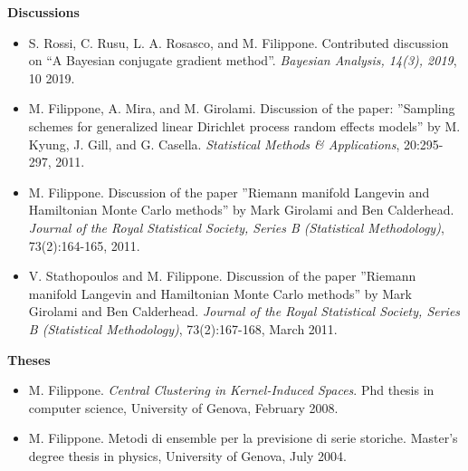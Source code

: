 \begin{itemize}
\end{itemize}\textbf{Discussions}\begin{itemize}\item  S. Rossi, C. Rusu, L. A. Rosasco, and M. Filippone. Contributed discussion on ``A Bayesian conjugate gradient method''. \emph{Bayesian Analysis, 14(3), 2019}, 10 2019.  
\item  M. Filippone, A. Mira, and M. Girolami. Discussion of the paper: ”Sampling schemes for generalized linear Dirichlet process random effects models” by M. Kyung, J. Gill, and G. Casella. \emph{Statistical Methods \& Applications}, 20:295-297, 2011.  
\item  M. Filippone. Discussion of the paper ”Riemann manifold Langevin and Hamiltonian Monte Carlo methods” by Mark Girolami and Ben Calderhead. \emph{Journal of the Royal Statistical Society, Series B (Statistical Methodology)}, 73(2):164-165, 2011.  
\item  V. Stathopoulos and M. Filippone. Discussion of the paper ”Riemann manifold Langevin and Hamiltonian Monte Carlo methods” by Mark Girolami and Ben Calderhead. \emph{Journal of the Royal Statistical Society, Series B (Statistical Methodology)}, 73(2):167-168, March 2011.  

\end{itemize}\textbf{Theses}\begin{itemize}\item  M. Filippone. \emph{Central Clustering in Kernel-Induced Spaces}. Phd thesis in computer science, University of Genova, February 2008. 
\item  M. Filippone. Metodi di ensemble per la previsione di serie storiche. Master's degree thesis in physics, University of Genova, July 2004. 

\end{itemize}

